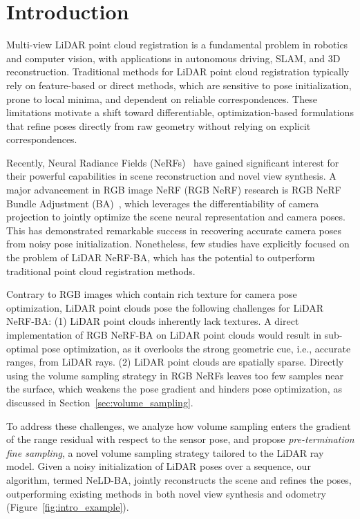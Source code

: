 \section{Introduction}
Multi-view LiDAR point cloud registration is a fundamental problem in robotics and computer vision, with applications in autonomous driving, SLAM, and 3D reconstruction. Traditional methods for LiDAR point cloud registration typically rely on feature-based or direct methods, which are sensitive to pose initialization, prone to local minima, and dependent on reliable correspondences. These limitations motivate a shift toward differentiable, optimization-based formulations that refine poses directly from raw geometry without relying on explicit correspondences.

Recently, Neural Radiance Fields (NeRFs)~\cite{mildenhall2020nerfOG} have gained significant interest for their powerful capabilities in scene reconstruction and novel view synthesis. A major advancement in RGB image NeRF (RGB NeRF) research is RGB NeRF Bundle Adjustment (BA)~\cite{lin2021barf,wang2022nerfmm,chen2023l2gnerf}, which leverages the differentiability of camera projection to jointly optimize the scene neural representation and camera poses. This has demonstrated remarkable success in recovering accurate camera poses from noisy pose initialization. Nonetheless, few studies have explicitly focused on the problem of LiDAR NeRF-BA, which has the potential to outperform traditional point cloud registration methods.  

Contrary to RGB images which contain rich texture for camera pose optimization, LiDAR point clouds pose the following challenges for LiDAR NeRF-BA: (1) LiDAR point clouds inherently lack textures. A direct implementation of RGB NeRF-BA on LiDAR point clouds would result in sub-optimal pose optimization, as it overlooks the strong geometric cue, i.e., accurate ranges, from LiDAR rays. (2) LiDAR point clouds are spatially sparse. Directly using the volume sampling strategy in RGB NeRFs leaves too few samples near the surface, which weakens the pose gradient and hinders pose optimization, as discussed in Section~\ref{sec:volume_sampling}.

To address these challenges, we analyze how volume sampling enters the gradient of the range residual with respect to the sensor pose, and propose \textit{pre-termination fine sampling}, a novel volume sampling strategy tailored to the LiDAR ray model. Given a noisy initialization of LiDAR poses over a sequence, our algorithm, termed NeLD-BA, jointly reconstructs the scene and refines the poses, outperforming existing methods in both novel view synthesis and odometry (Figure~\ref{fig:intro_example}).

